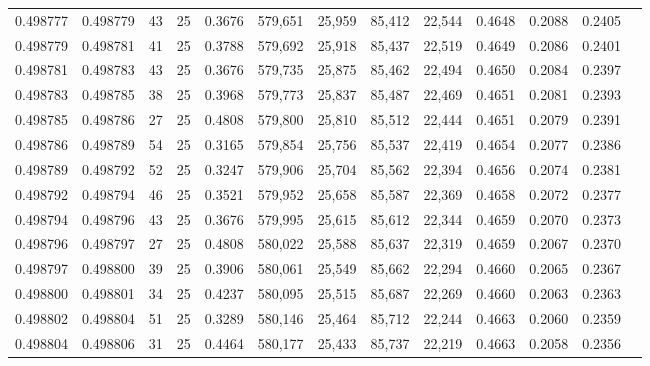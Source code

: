 \begin{tabular}{rrrrrrrrrrrrr}
0.498777 & 0.498779 &    43 &  25 &                                     0.3676 & 579,651 &  25,959 &  85,412 &  22,544 & 0.4648 & 0.2088 & 0.2405 \\
0.498779 & 0.498781 &    41 &  25 &                                     0.3788 & 579,692 &  25,918 &  85,437 &  22,519 & 0.4649 & 0.2086 & 0.2401 \\
0.498781 & 0.498783 &    43 &  25 &                                     0.3676 & 579,735 &  25,875 &  85,462 &  22,494 & 0.4650 & 0.2084 & 0.2397 \\
0.498783 & 0.498785 &    38 &  25 &                                     0.3968 & 579,773 &  25,837 &  85,487 &  22,469 & 0.4651 & 0.2081 & 0.2393 \\
0.498785 & 0.498786 &    27 &  25 &                                     0.4808 & 579,800 &  25,810 &  85,512 &  22,444 & 0.4651 & 0.2079 & 0.2391 \\
0.498786 & 0.498789 &    54 &  25 &                                     0.3165 & 579,854 &  25,756 &  85,537 &  22,419 & 0.4654 & 0.2077 & 0.2386 \\
0.498789 & 0.498792 &    52 &  25 &                                     0.3247 & 579,906 &  25,704 &  85,562 &  22,394 & 0.4656 & 0.2074 & 0.2381 \\
0.498792 & 0.498794 &    46 &  25 &                                     0.3521 & 579,952 &  25,658 &  85,587 &  22,369 & 0.4658 & 0.2072 & 0.2377 \\
0.498794 & 0.498796 &    43 &  25 &                                     0.3676 & 579,995 &  25,615 &  85,612 &  22,344 & 0.4659 & 0.2070 & 0.2373 \\
0.498796 & 0.498797 &    27 &  25 &                                     0.4808 & 580,022 &  25,588 &  85,637 &  22,319 & 0.4659 & 0.2067 & 0.2370 \\
0.498797 & 0.498800 &    39 &  25 &                                     0.3906 & 580,061 &  25,549 &  85,662 &  22,294 & 0.4660 & 0.2065 & 0.2367 \\
0.498800 & 0.498801 &    34 &  25 &                                     0.4237 & 580,095 &  25,515 &  85,687 &  22,269 & 0.4660 & 0.2063 & 0.2363 \\
0.498802 & 0.498804 &    51 &  25 &                                     0.3289 & 580,146 &  25,464 &  85,712 &  22,244 & 0.4663 & 0.2060 & 0.2359 \\
0.498804 & 0.498806 &    31 &  25 &                                     0.4464 & 580,177 &  25,433 &  85,737 &  22,219 & 0.4663 & 0.2058 & 0.2356 \\

\end{tabular}
